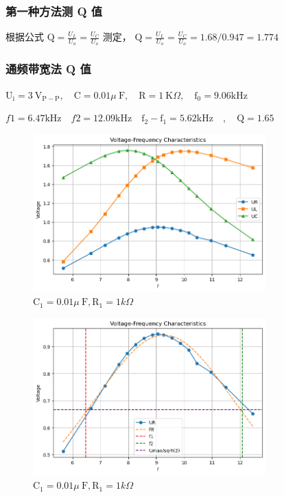 \documentclass{article}
\begin{document}
\subsubsection{第一种方法测 Q 值}
根据公式 $\mathrm{Q}=\frac{U_L}{U_o}=\frac{U_C}{U_o}$ 测定， $\mathrm{Q}=\frac{U_L}{U_o}=\frac{U_C}{U_o}=1.68/0.947=1.774$
\subsubsection{通频带宽法 Q 值}
$\mathrm{U}_{\mathrm{i}}=3 \mathrm{~V}_{\mathrm{P}-\mathrm{P}}, \quad \mathrm{C}=0.01 \mu \mathrm{~F}, \quad \mathrm{R}=1 \mathrm{~K} \Omega, \quad \mathrm{f}_0=9.06 \mathrm{k}  \mathrm{Hz}$

$f1 = 6.47 \mathrm{kHz}\quad f2 = 12.09 \mathrm{kHz} \quad \mathrm{f}_2-\mathrm{f}_1=5.62\mathrm{kHz}\quad, \quad \mathrm{Q}= 1.65$

\begin{figure}[H]
    \centering
    \includegraphics[width=0.8\textwidth]{output2.png}
    \caption{ $\mathrm{C}_1=0.01 \mu \mathrm{~F}, \mathrm{R}_1=1k \Omega$}
    \label{fig:diff_circuit}
\end{figure}
\begin{figure}[H]
    \centering
    \includegraphics[width=0.8\textwidth]{output4.png}
    \caption{ $\mathrm{C}_1=0.01 \mu \mathrm{~F}, \mathrm{R}_1=1k \Omega$}
    \label{fig:diff_circuit}
\end{figure}
\end{document}
